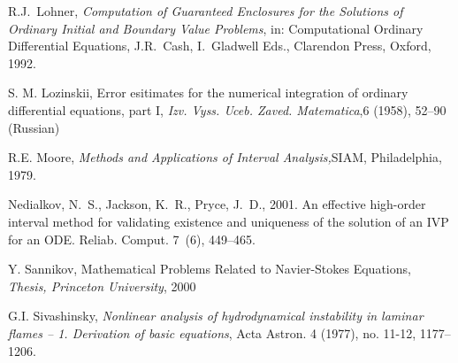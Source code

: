 \begin{thebibliography}{HNW00}




 R.J.\ Lohner, \emph{Computation of Guaranteed Enclosures for the Solutions
    of Ordinary Initial and Boundary Value Problems\/}, in:  Computational Ordinary Differential Equations,
J.R.\ Cash, I.\ Gladwell Eds., Clarendon Press, Oxford, 1992.

  S. M. Lozinskii, Error esitimates for the numerical integration of ordinary
   differential equations, part I,  {\em Izv. Vyss. Uceb. Zaved.
   Matematica},6 (1958), 52--90 (Russian)



 R.E. Moore, {\em Methods and Applications of Interval Analysis,}SIAM, Philadelphia, 1979.



 Nedialkov, N.~S., Jackson, K.~R., Pryce, J.~D., 2001. An effective high-order
  interval method for validating existence and uniqueness of the solution of an
  IVP for an ODE. Reliab. Comput. 7~(6), 449--465.


 Y. Sannikov, Mathematical Problems Related to
Navier-Stokes Equations, {\em Thesis, Princeton University}, 2000

 G.I. Sivashinsky,
\emph{  Nonlinear analysis of hydrodynamical instability in
    laminar flames -- 1. Derivation of basic equations},
Acta Astron. 4 (1977), no. 11-12, 1177--1206.



\end{thebibliography}
